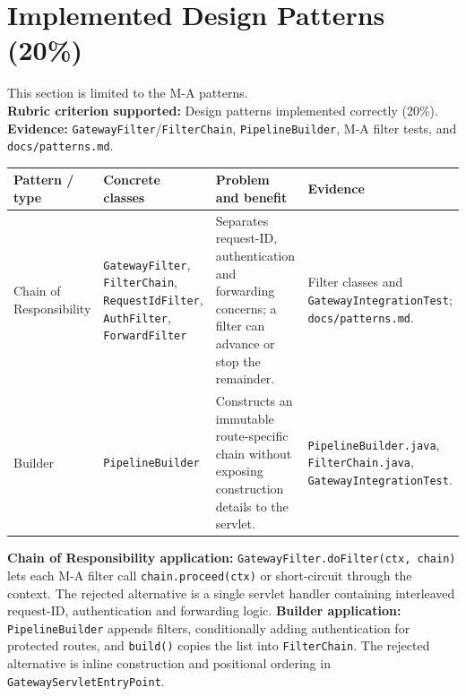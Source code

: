 \documentclass[12pt,a4paper]{article}
\newcommand{\cls}[1]{\nolinkurl{#1}}
\begin{document}
\section{Implemented Design Patterns (20\%)}\label{sec:patterns}
This section is limited to the M-A patterns.\\
\textbf{Rubric criterion supported:} Design patterns implemented correctly (20\%). \textbf{Evidence:} \cls{GatewayFilter}/\cls{FilterChain}, \cls{PipelineBuilder}, M-A filter tests, and \cls{docs/patterns.md}.
\begin{longtable}{L{2.7cm} L{3.4cm} L{3.7cm} L{3.3cm}}\toprule
\textbf{Pattern / type} & \textbf{Concrete classes} & \textbf{Problem and benefit} & \textbf{Evidence}\\\midrule\endhead
Chain of Responsibility & \cls{GatewayFilter}, \cls{FilterChain}, \cls{RequestIdFilter}, \cls{AuthFilter}, \cls{ForwardFilter} & Separates request-ID, authentication and forwarding concerns; a filter can advance or stop the remainder. & Filter classes and \cls{GatewayIntegrationTest}; \cls{docs/patterns.md}.\\
Builder & \cls{PipelineBuilder} & Constructs an immutable route-specific chain without exposing construction details to the servlet. & \cls{PipelineBuilder.java}, \cls{FilterChain.java}, \cls{GatewayIntegrationTest}.\\\bottomrule\end{longtable}
\textbf{Chain of Responsibility application:} \cls{GatewayFilter.doFilter(ctx, chain)} lets each M-A filter call \cls{chain.proceed(ctx)} or short-circuit through the context. The rejected alternative is a single servlet handler containing interleaved request-ID, authentication and forwarding logic.
\textbf{Builder application:} \cls{PipelineBuilder} appends filters, conditionally adding authentication for protected routes, and \cls{build()} copies the list into \cls{FilterChain}. The rejected alternative is inline construction and positional ordering in \cls{GatewayServletEntryPoint}.
\end{document}
